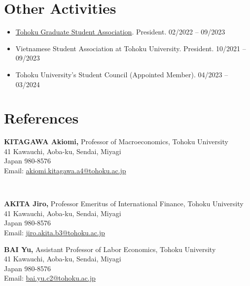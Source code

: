 \documentclass[margin,line]{res}
\begin{document}
\begin{resume}
\section{\sc Other Activities}
\begin{itemize}
\item[] \href{https://inseikaitohoku.org/}{Tohoku Graduate Student Association}. President.  \hfill 02/2022 -- 09/2023
\item[] Vietnamese Student Association at Tohoku University. President.  \hfill 10/2021 -- 09/2023
\item[] Tohoku University's Student Council (Appointed Member). \hfill 04/2023 -- 03/2024
\end{itemize}


\section{\sc References}
\vspace*{.05in}
\parbox{\textwidth}{
{\bf KITAGAWA Akiomi,} Professor of Macroeconomics, Tohoku University \\
41 Kawauchi, Aoba-ku, Sendai, Miyagi \\
Japan 980-8576 \\
Email: \href{mailto:akiomi.kitagawa.a4@tohoku.ac.jp}{akiomi.kitagawa.a4@tohoku.ac.jp}} \\

\par
\parbox{\textwidth}{
{\bf AKITA Jiro,} Professor Emeritus of International Finance, Tohoku University\\
41 Kawauchi, Aoba-ku, Sendai, Miyagi \\
Japan 980-8576 \\
Email: \href{mailto:jiro.akita.b3@tohoku.ac.jp}{jiro.akita.b3@tohoku.ac.jp}}

\par
\parbox{\textwidth}{
{\bf BAI Yu,} Assistant Professor of Labor Economics, Tohoku University\\
41 Kawauchi, Aoba-ku, Sendai, Miyagi \\
Japan 980-8576 \\
Email: \href{mailto:bai.yu.c2tohoku.ac.jp}{bai.yu.c2@tohoku.ac.jp}}


\end{resume}
\end{document}
